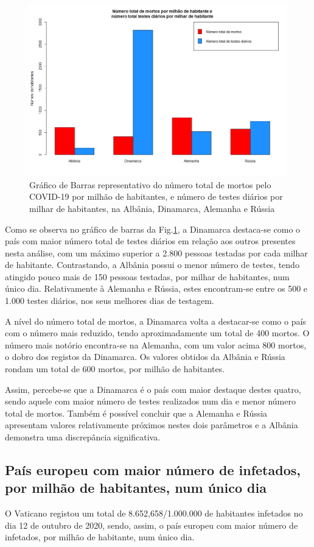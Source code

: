 \documentclass[conference]{IEEEtran}
\begin{document}
\begin{figure}[htbp]
\centerline{\includegraphics[width=0.95\columnwidth]{images/01.d.png}}
\caption{Gráfico de Barras representativo do número total de mortos pelo COVID-19 por milhão de habitantes, e número de testes diários por milhar de habitantes, na Albânia, Dinamarca, Alemanha e Rússia}
\label{1d}
\end{figure}

Como se observa no gráfico de barras da Fig.\ref{1d}, a Dinamarca destaca-se como o país com maior número total de testes diários em relação aos outros presentes nesta análise, com um máximo superior a 2.800 pessoas testadas por cada milhar de habitante. Contrastando, a Albânia possui o menor número de testes, tendo atingido pouco mais de 150 pessoas testadas, por milhar de habitantes, num único dia. Relativamente à Alemanha e Rússia, estes encontram-se entre os 500 e 1.000 testes diários, nos seus melhores dias de testagem. 

A nível do número total de mortos, a Dinamarca volta a destacar-se como o país com o número mais reduzido, tendo aproximadamente um total de 400 mortos. O número mais notório encontra-se na Alemanha, com um valor acima 800 mortos, o dobro dos registos da Dinamarca. Os valores obtidos da Albânia e Rússia rondam um total de 600 mortos, por milhão de habitantes. 

Assim, percebe-se que a Dinamarca é o país com maior destaque destes quatro, sendo aquele com maior número de testes realizados num dia e menor número total de mortos. Também é possível concluir que a Alemanha e Rússia apresentam valores relativamente próximos nestes dois parâmetros e a Albânia demonstra uma discrepância significativa.


\subsection{País europeu com maior número de infetados, por milhão de habitantes, num único dia}
O Vaticano registou um total de 8.652,658/1.000.000 de habitantes infetados no dia 12 de outubro de 2020, sendo, assim, o país europeu com maior número de infetados, por milhão de habitante, num único dia. 
\end{document}
